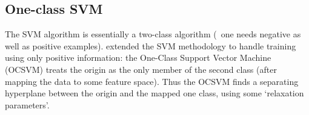 

\subsection{One-class SVM}

The SVM algorithm is essentially a two-class algorithm (\ie~one needs negative as well as positive examples).
\cite{Scholkopf2001} extended the SVM methodology to handle training using only positive information:
the One-Class Support Vector Machine (OCSVM) treats the origin as the only member of the second class (after mapping the data to some feature space). Thus the OCSVM finds a separating hyperplane between the origin and the mapped one class, using some `relaxation parameters'.

